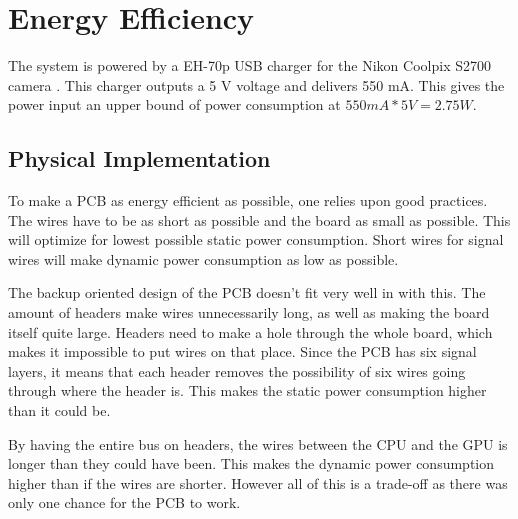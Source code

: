 \documentclass[../main/report.tex]{subfiles}
\begin{document}
\section{Energy Efficiency}

The system is powered by a EH-70p USB charger for the Nikon Coolpix S2700 camera \cite[p. 196]{usb-charger}.
This charger outputs a 5 V voltage and delivers 550 mA.
This gives the power input an upper bound of power consumption at $550mA * 5V = 2.75W$.

\subsection{Physical Implementation}

To make a PCB as energy efficient as possible, one relies upon good practices.
The wires have to be as short as possible and the board as small as possible.
This will optimize for lowest possible static power consumption.
Short wires for signal wires will make dynamic power consumption as low as possible.

The backup oriented design of the PCB doesn't fit very well in with this.
The amount of headers make wires unnecessarily long, as well as making the board itself quite large.
Headers need to make a hole through the whole board, which makes it impossible to put wires on that place.
Since the PCB has six signal layers, it means that each header removes the possibility of six wires going through where the header is.
This makes the static power consumption higher than it could be.

By having the entire bus on headers, the wires between the CPU and the GPU is longer than they could have been.
This makes the dynamic power consumption higher than if the wires are shorter.
However all of this is a trade-off as there was only one chance for the PCB to work.

\end{document}
